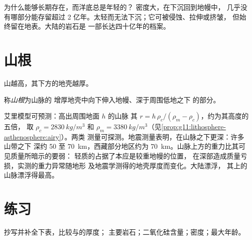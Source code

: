 为什么能够长期存在，而洋底总是年轻的？
密度大，在下沉回到地幔中，
几乎没有哪部分能存留超过 2 亿年。太轻而无法下沉；它可被侵蚀、拉伸或挤皱，
但始终留在地表。大陆的岩石是
一部长达四十亿年的档案。

\section{山根}

山越高，其下方的地壳越厚。

\begin{definition}[山根]\label{def:g12:continental-crust:root}
称\emph{山根}为山脉的
增厚地壳中向下伸入地幔、深于周围低地之下
的部分。
\end{definition}

艾里模型可预测：高出周围地面 $h$ 的山脉
其 $r = h\,\rho_c/(\rho_m - \rho_c)$，约为其高度的五倍，
取 $\rho_c = \qty{2830}{kg/m^3}$ 和 $\rho_m =
\qty{3380}{kg/m^3}$（见\cref{prop:g11:lithosphere-asthenosphere:airy}）。两类
测量可探测。地震测量表明，在山脉之下更深：许多山带之下
深约 50 至 \qty{70}{km}，西藏部分地区约为
\qty{70}{km}。山脉上方的重力比其可见质量所暗示的要弱：
轻质的占据了本应是较重地幔的位置，
在深部造成质量亏损，实测的重力异常随地形
及地震学测得的地壳厚度而变化。大陆漂浮，
其上的山脉漂浮得最高。

\section{练习}

\begin{exercise}[$\star$]\label{exo:g12:continental-crust:1}
抄写并补全下表，比较与的厚度；
主要岩石；二氧化硅含量；密度；最大年龄。
\end{exercise}

